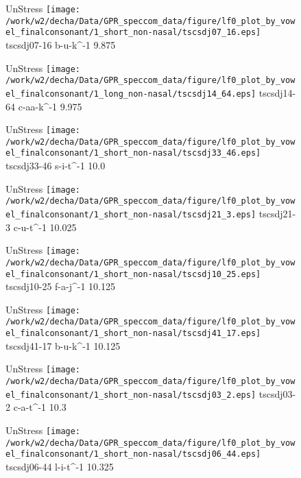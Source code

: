 \documentclass{article}
\begin{document}
\begin{figure}[t]
\begin{minipage}[b]{.24\textwidth}
UnStress
\centering
\texttt{[image: /work/w2/decha/Data/GPR\_speccom\_data/figure/lf0\_plot\_by\_vowel\_finalconsonant/1\_short\_non-nasal/tscsdj07\_16.eps]}
tscsdj07-16 b-u-k\textasciicircum-1 9.875
\end{minipage}
\begin{minipage}[b]{.24\textwidth}
UnStress
\centering
\texttt{[image: /work/w2/decha/Data/GPR\_speccom\_data/figure/lf0\_plot\_by\_vowel\_finalconsonant/1\_long\_non-nasal/tscsdj14\_64.eps]}
tscsdj14-64 c-aa-k\textasciicircum-1 9.975
\end{minipage}
\begin{minipage}[b]{.24\textwidth}
UnStress
\centering
\texttt{[image: /work/w2/decha/Data/GPR\_speccom\_data/figure/lf0\_plot\_by\_vowel\_finalconsonant/1\_short\_non-nasal/tscsdj33\_46.eps]}
tscsdj33-46 s-i-t\textasciicircum-1 10.0
\end{minipage}
\begin{minipage}[b]{.24\textwidth}
UnStress
\centering
\texttt{[image: /work/w2/decha/Data/GPR\_speccom\_data/figure/lf0\_plot\_by\_vowel\_finalconsonant/1\_short\_non-nasal/tscsdj21\_3.eps]}
tscsdj21-3 c-u-t\textasciicircum-1 10.025
\end{minipage}
\end{figure}
\clearpage
\begin{figure}[t]
\begin{minipage}[b]{.24\textwidth}
UnStress
\centering
\texttt{[image: /work/w2/decha/Data/GPR\_speccom\_data/figure/lf0\_plot\_by\_vowel\_finalconsonant/1\_short\_non-nasal/tscsdj10\_25.eps]}
tscsdj10-25 f-a-j\textasciicircum-1 10.125
\end{minipage}
\begin{minipage}[b]{.24\textwidth}
UnStress
\centering
\texttt{[image: /work/w2/decha/Data/GPR\_speccom\_data/figure/lf0\_plot\_by\_vowel\_finalconsonant/1\_short\_non-nasal/tscsdj41\_17.eps]}
tscsdj41-17 b-u-k\textasciicircum-1 10.125
\end{minipage}
\begin{minipage}[b]{.24\textwidth}
UnStress
\centering
\texttt{[image: /work/w2/decha/Data/GPR\_speccom\_data/figure/lf0\_plot\_by\_vowel\_finalconsonant/1\_short\_non-nasal/tscsdj03\_2.eps]}
tscsdj03-2 c-a-t\textasciicircum-1 10.3
\end{minipage}
\begin{minipage}[b]{.24\textwidth}
UnStress
\centering
\texttt{[image: /work/w2/decha/Data/GPR\_speccom\_data/figure/lf0\_plot\_by\_vowel\_finalconsonant/1\_short\_non-nasal/tscsdj06\_44.eps]}
tscsdj06-44 l-i-t\textasciicircum-1 10.325
\end{minipage}
\end{figure}
\end{document}
